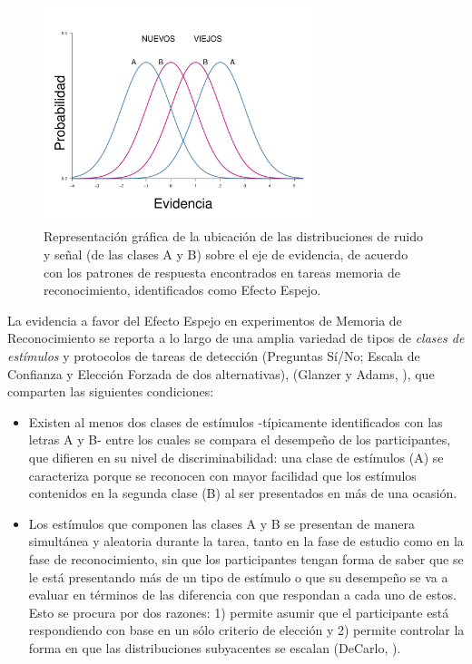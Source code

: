 \begin{figure}[h]
\centering
\includegraphics[width=0.7\textwidth]{Figures/EfectoEspejo}
\caption[Efecto Espejo: Las distribuciones de ruido y señal A y B se reflejan entre sí]{Representación gráfica de la ubicación de las distribuciones de ruido y señal (de las clases A y B) sobre el eje de evidencia, de acuerdo con los patrones de respuesta encontrados en tareas memoria de reconocimiento, identificados como Efecto Espejo.}
\label{fig:Ejem_EfectoEspejo}
\end{figure}

La evidencia a favor del Efecto Espejo en experimentos de Memoria de Reconocimiento se reporta a lo largo de una amplia variedad de tipos de \textit{clases de estímulos} y protocolos de tareas de detección (Preguntas Sí/No; Escala de Confianza y Elección Forzada de dos alternativas), (Glanzer y Adams, \citeyear{Glanzer1990}), que comparten las siguientes condiciones:\\

\begin{itemize}
\item Existen al menos dos clases de estímulos -típicamente identificados con las letras A y B- entre los cuales se compara el desempeño de los participantes, que difieren en su nivel de discriminabilidad: una clase de estímulos (A) se caracteriza porque se reconocen con mayor facilidad que los estímulos contenidos en la segunda clase (B) al ser presentados en más de una ocasión.\\

\item Los estímulos que componen las clases A y B se presentan de manera simultánea y aleatoria durante la tarea, tanto en la fase de estudio como en la fase de reconocimiento, sin que los participantes tengan forma de saber que se le está presentando más de un tipo de estímulo o  que su desempeño se va a evaluar en términos de las diferencia con que respondan a cada uno de estos. Esto se procura por dos razones: 1) permite asumir que el participante está respondiendo con base en un sólo criterio de elección y 2) permite controlar la forma en que las distribuciones subyacentes se escalan (DeCarlo, \citeyear{DeCarlo2007}).\\
\end{itemize}

